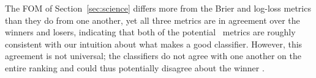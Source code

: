 The FOM of Section~\ref{sec:science} differs more from the Brier and log-loss metrics than they do from one another, yet all three metrics are in agreement over the winners and losers, indicating that both of the potential \plasticc\ metrics are roughly consistent with our intuition about what makes a good classifier.
However, this agreement is not universal; the classifiers do not agree with one another on the entire ranking and could thus potentially disagree about the winner .


